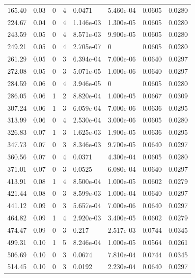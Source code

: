 \documentclass[preview]{standalone}
\begin{document}
{{\begin{tabular}{L{1.2cm}C{1.2cm} C{0.3cm}C{0.5cm} C{1.4cm}C{1.4cm} C{1.4cm}C{1.4cm}}
  165.40  &  0.03  & 0     &  4 &  0.0471  & 5.460e-04  & 0.0605 &  0.0280   \\ 
  224.67  &  0.04  & 0     &  4 &  1.146e-03  & 1.300e-05  & 0.0605 &  0.0280   \\ 
  243.59  &  0.05  & 0     &  4 &  8.571e-03  & 9.900e-05  & 0.0605 &  0.0280   \\ 
  249.21  &  0.05  & 0     &  4 &  2.705e-07  & 0  & 0.0605 &  0.0280   \\ 
  261.29  &  0.05  & 0     &  3 &  6.394e-04  & 7.000e-06  & 0.0640 &  0.0297   \\ 
  272.08  &  0.05  & 0     &  3 &  5.071e-05  & 1.000e-06  & 0.0640 &  0.0297   \\ 
  284.59  &  0.06  & 0     &  4 &  3.946e-05  & 0  & 0.0605 &  0.0280   \\ 
  286.05  &  0.06  & 1     &  2 &  8.820e-04  & 1.000e-05  & 0.0667 &  0.0309   \\ 
  307.24  &  0.06  & 1     &  3 &  6.059e-04  & 7.000e-06  & 0.0636 &  0.0295   \\ 
  313.99  &  0.06  & 0     &  4 &  2.530e-04  & 3.000e-06  & 0.0605 &  0.0280   \\ 
  326.83  &  0.07  & 1     &  3 &  1.625e-03  & 1.900e-05  & 0.0636 &  0.0295   \\ 
  347.73  &  0.07  & 0     &  3 &  8.346e-03  & 9.700e-05  & 0.0640 &  0.0297   \\ 
  360.56  &  0.07  & 0     &  4 &  0.0371  & 4.300e-04  & 0.0605 &  0.0280   \\ 
  371.01  &  0.07  & 0     &  3 &  0.0525  & 6.080e-04  & 0.0640 &  0.0297   \\ 
  413.91  &  0.08  & 1     &  4 &  8.500e-04  & 1.000e-05  & 0.0602 &  0.0279   \\ 
  421.44  &  0.08  & 0     &  3 &  8.599e-03  & 1.000e-04  & 0.0640 &  0.0297   \\ 
  441.12  &  0.09  & 0     &  3 &  5.657e-04  & 7.000e-06  & 0.0640 &  0.0297   \\ 
  464.82  &  0.09  & 1     &  4 &  2.920e-03  & 3.400e-05  & 0.0602 &  0.0279   \\ 
  474.47  &  0.09  & 0     &  3 &  0.217  & 2.517e-03  & 0.0744 &  0.0345   \\ 
  499.31  &  0.10  & 1     &  5 &  8.246e-04  & 1.000e-05  & 0.0564 &  0.0261   \\ 
  506.69  &  0.10  & 0     &  3 &  0.0674  & 7.810e-04  & 0.0744 &  0.0345   \\ 
  514.45  &  0.10  & 0     &  3 &  0.0192  & 2.230e-04  & 0.0640 &  0.0297   \\ 

\end{tabular}}}
\end{document}
